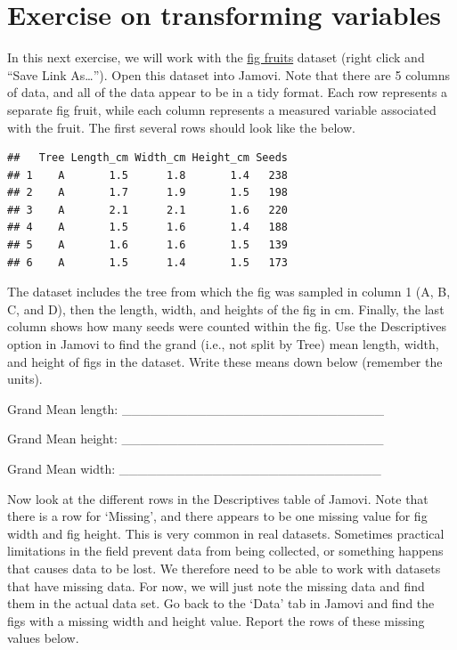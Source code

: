 \documentclass[
]{scrbook}
\begin{document}
\hypertarget{transforming_variables_02}{%
\section{Exercise on transforming variables}\label{transforming_variables_02}}

In this next exercise, we will work with the \href{https://raw.githubusercontent.com/bradduthie/SCIU4T4/main/data/fig_fruits.csv}{fig fruits} dataset (right click and ``Save Link As\ldots{}'').
Open this dataset into Jamovi.
Note that there are 5 columns of data, and all of the data appear to be in a tidy format.
Each row represents a separate fig fruit, while each column represents a measured variable associated with the fruit.
The first several rows should look like the below.

\begin{verbatim}
##   Tree Length_cm Width_cm Height_cm Seeds
## 1    A       1.5      1.8       1.4   238
## 2    A       1.7      1.9       1.5   198
## 3    A       2.1      2.1       1.6   220
## 4    A       1.5      1.6       1.4   188
## 5    A       1.6      1.6       1.5   139
## 6    A       1.5      1.4       1.5   173
\end{verbatim}

The dataset includes the tree from which the fig was sampled in column 1 (A, B, C, and D), then the length, width, and heights of the fig in cm.
Finally, the last column shows how many seeds were counted within the fig.
Use the Descriptives option in Jamovi to find the grand (i.e., not split by Tree) mean length, width, and height of figs in the dataset.
Write these means down below (remember the units).

Grand Mean length: \_\_\_\_\_\_\_\_\_\_\_\_\_\_\_\_\_\_\_\_\_\_\_\_\_\_\_\_

Grand Mean height: \_\_\_\_\_\_\_\_\_\_\_\_\_\_\_\_\_\_\_\_\_\_\_\_\_\_\_\_

Grand Mean width: \_\_\_\_\_\_\_\_\_\_\_\_\_\_\_\_\_\_\_\_\_\_\_\_\_\_\_\_

Now look at the different rows in the Descriptives table of Jamovi.
Note that there is a row for `Missing', and there appears to be one missing value for fig width and fig height.
This is very common in real datasets.
Sometimes practical limitations in the field prevent data from being collected, or something happens that causes data to be lost.
We therefore need to be able to work with datasets that have missing data.
For now, we will just note the missing data and find them in the actual data set.
Go back to the `Data' tab in Jamovi and find the figs with a missing width and height value.
Report the rows of these missing values below.
\end{document}
